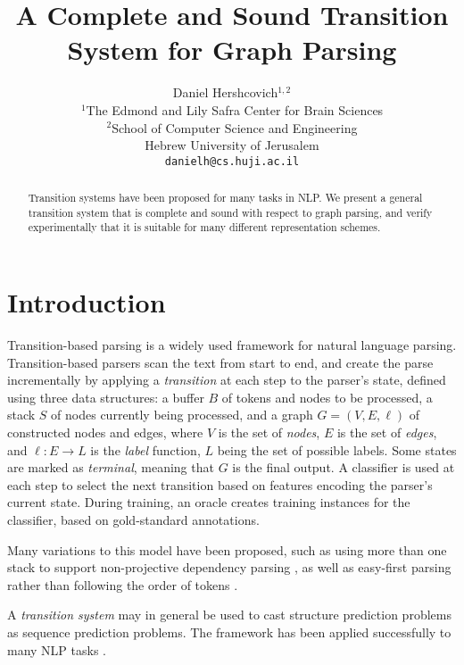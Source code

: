 \documentclass[11pt,a4paper]{article}
\title{A Complete and Sound Transition System for Graph Parsing}
\author{Daniel Hershcovich$^{1,2}$ \\
  $^1$The Edmond and Lily Safra Center for Brain Sciences \\
  $^2$School of Computer Science and Engineering \\
  Hebrew University of Jerusalem \\
  \texttt{danielh@cs.huji.ac.il}
}
\date{}
\begin{document}
\maketitle

\begin{abstract}
Transition systems have been proposed for many tasks in NLP.
We present a general transition system that is complete and sound with respect to graph parsing,
and verify experimentally that it is suitable for many different representation schemes.
\end{abstract}


\section{Introduction}\label{sec:introduction}

Transition-based parsing is a widely used framework for natural language parsing.
Transition-based parsers scan the text from start to end,
and create the parse incrementally by applying a \textit{transition}
at each step to the parser's state,
defined using three data structures: a buffer $B$ of tokens and nodes to be processed,
a stack $S$ of nodes currently being processed,
and a graph $G=(V,E,\ell)$ of constructed nodes and edges,
where $V$ is the set of \emph{nodes}, $E$ is the set of \emph{edges},
and $\ell : E \to L$ is the \emph{label} function, $L$ being the set of possible labels.
Some states are marked as \textit{terminal}, meaning that $G$ is the final output.
A classifier is used at each step to select the next transition based on features
encoding the parser's current state.
During training, an oracle creates training instances for the classifier,
based on gold-standard annotations.

Many variations to this model have been proposed, such as using more than one stack to support
non-projective dependency parsing \cite{gomez2010a},
as well as easy-first parsing rather than following the order of tokens \cite{goldberg2010efficient}.

A \textit{transition system} \cite{Nivr:06,nivre2008algorithms} may in general be used to cast structure prediction
problems as sequence prediction problems.
The framework has been applied successfully to many NLP tasks
\cite[][among others]{bohnet2012transition,lample-EtAl:2016:N16-1,kiperwasser2016simple,zhang-zhang-fu:2016:P16-1,kong2017dragnn,hershcovich2017a}.
\end{document}
